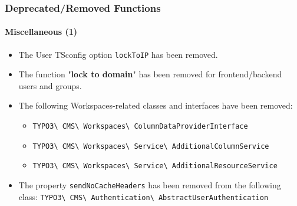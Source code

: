 %

\begin{frame}[fragile]
	\frametitle{Deprecated/Removed Functions}
	\framesubtitle{Miscellaneous (1)}

	\begin{itemize}
		\item The User TSconfig option \texttt{lockToIP} has been removed.
		\item The function "\textbf{lock to domain}" has been removed for frontend/backend
			users and groups.
		\item The following Workspaces-related classes and interfaces have been removed:
			\begin{itemize}\smaller
				\item \texttt{TYPO3\textbackslash
					CMS\textbackslash
					Workspaces\textbackslash
					ColumnDataProviderInterface}
				\item \texttt{TYPO3\textbackslash
					CMS\textbackslash
					Workspaces\textbackslash
					Service\textbackslash
					AdditionalColumnService}
				\item \texttt{TYPO3\textbackslash
					CMS\textbackslash
					Workspaces\textbackslash
					Service\textbackslash
					AdditionalResourceService}
			\end{itemize}\normalsize

		\item The property \texttt{sendNoCacheHeaders} has been removed from the following class:\newline
			\smaller\texttt{TYPO3\textbackslash
				CMS\textbackslash
				Authentication\textbackslash
				AbstractUserAuthentication}\normalsize
	\end{itemize}

\end{frame}

